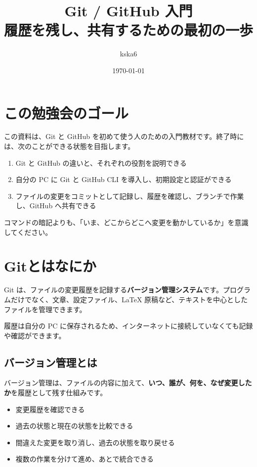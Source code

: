 \documentclass[a4paper,11pt]{jlreq}
\title{Git / GitHub 入門\\
  \large 履歴を残し、共有するための最初の一歩}
\author{kska6}
\date{\today}
\newcommand{\term}[1]{\textbf{#1}}
\begin{document}
\maketitle

\tableofcontents
\newpage

\section*{この勉強会のゴール}

この資料は、Git と GitHub を初めて使う人のための入門教材です。終了時には、次のことができる状態を目指します。

\begin{enumerate}
  \item Git と GitHub の違いと、それぞれの役割を説明できる
  \item 自分の PC に Git と GitHub CLI を導入し、初期設定と認証ができる
  \item ファイルの変更をコミットとして記録し、履歴を確認し、ブランチで作業し、GitHub へ共有できる
\end{enumerate}

コマンドの暗記よりも、「いま、どこからどこへ変更を動かしているか」を意識してください。

\section{Gitとはなにか}

Git は、ファイルの変更履歴を記録する\term{バージョン管理システム}です。プログラムだけでなく、文章、設定ファイル、LaTeX 原稿など、テキストを中心としたファイルを管理できます。

履歴は自分の PC に保存されるため、インターネットに接続していなくても記録や確認ができます。

\subsection{バージョン管理とは}

バージョン管理は、ファイルの内容に加えて、\term{いつ、誰が、何を、なぜ変更したか}を履歴として残す仕組みです。

\begin{itemize}
  \item 変更履歴を確認できる
  \item 過去の状態と現在の状態を比較できる
  \item 間違えた変更を取り消し、過去の状態を取り戻せる
  \item 複数の作業を分けて進め、あとで統合できる
\end{itemize}
\end{document}
